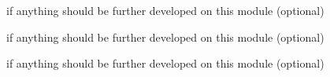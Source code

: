 
\begin{DoxyRefList}
\item[\label{todo__todo000001}%
\hypertarget{todo__todo000001}{}%
File \hyperlink{four_leds_on_8c}{four\-Leds\-On.c} ]if anything should be further developed on this module (optional)  
\item[\label{todo__todo000002}%
\hypertarget{todo__todo000002}{}%
File \hyperlink{four_leds_on_8h}{four\-Leds\-On.h} ]if anything should be further developed on this module (optional)  
\item[\label{todo__todo000003}%
\hypertarget{todo__todo000003}{}%
File \hyperlink{main_8c}{main.c} ]if anything should be further developed on this module (optional) 
\end{DoxyRefList}